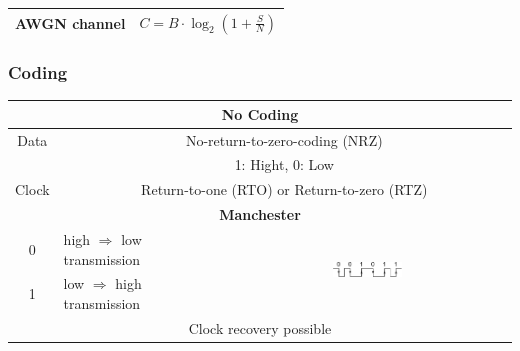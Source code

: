 \begin{table}[!h]
	\centering
	\begin{tabular}{|c|c|}
		\hline
		AWGN channel & $C = B \cdot \log_2 \left( 1 + \frac{S}{N} \right)$ \\ \hline
	\end{tabular}
\end{table}

\subsubsection{Coding}
\begin{table}[!h]
	\centering
	\begin{tabular}{|c|l|c|}
		\hline
		\multicolumn{3}{|c|}{\textbf{No Coding}}                                                                                                                   \\ \hline
		       Data        & \multicolumn{2}{|c|}{No-return-to-zero-coding (NRZ)}                                                                                  \\
		                   & \multicolumn{2}{|c|}{1: Hight, 0: Low}                                                                                                \\
		      Clock        & \multicolumn{2}{|c|}{Return-to-one (RTO) or Return-to-zero (RTZ)}                                                                     \\ \hline\hline
		      
		\multicolumn{3}{|c|}{\textbf{Manchester}}                                                                                                                  \\ \hline
		        0          & high $\Rightarrow$ low transmission & \multirow{2}{*}{\includegraphics[width=0.25\textwidth]{images/High_Speed_Digital/Manchester-Code.pdf}} \\
		        1          & low $\Rightarrow$ high transmission &  \\ \hline
		\multicolumn{3}{|c|}{Clock recovery possible}                                                                                                              \\ \hline\hline
		

\end{tabular}
\end{table}
